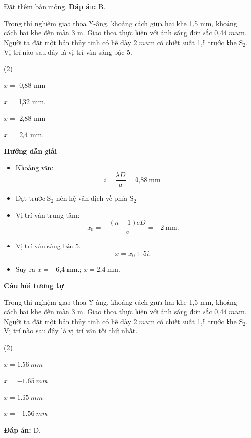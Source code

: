 \begin{dang}{Đặt thêm bản mỏng.}
{\textbf{Đáp án:} B.
}

{Trong thí nghiệm giao thoa Y-âng, khoảng cách giữa hai khe 1,5 mm, khoảng cách hai khe đến màn 3 m. Giao thoa thực hiện với ánh sáng đơn sắc 0,44 $mu$m. Người ta đặt một bản thủy tinh có bề dày 2 $mu$m có chiết suất 1,5 trước khe $\text{S}_2$. Vị trí nào sau đây là vị trí vân sáng bậc 5.
\begin{mcq}(2)
\item $x =$ 0,88 mm.		
\item $x =$ l,32 mm.	  	
\item $x =$ 2,88 mm.		
\item $x =$ 2,4 mm.
\end{mcq}
}
{\begin{center}
	\textbf{Hướng dẫn giải}
\end{center}

\begin{itemize}
	\item Khoảng vân:
	\begin{equation*}
		i=\dfrac{\lambda D}{a} = \text{0,88}\ \text{mm}.
	\end{equation*}
	\item Đặt trước $\text{S}_2$ nên hệ vân dịch về phía $\text{S}_2$.
	\item Vị trí vân trung tâm:
	\begin{equation*}
	x_0= - \dfrac{(n-1)eD}{a}=-2 \ \text{mm}.
	\end{equation*}
	\item Vị trí vân sáng bậc 5:
	\begin{equation*}
	x=x_0 \pm 5i.
	\end{equation*}
	\item Suy ra $x= -\text{6,4}\ \text{mm}.$; $x=\text{2,4}\ \text{mm}$.
\end{itemize}

\begin{center}
	\textbf{Câu hỏi tương tự}
\end{center}

Trong thí nghiệm giao thoa Y-âng, khoảng cách giữa hai khe 1,5 mm, khoảng cách hai khe đến màn 3 m. Giao thoa thực hiện với ánh sáng đơn sắc 0,44 $mu$m. Người ta đặt một bản thủy tinh có bề dày 2 $mu$m có chiết suất 1,5 trước khe $\text{S}_2$. Vị trí nào sau đây là vị trí vân tối thứ nhất.
\begin{mcq}(2)
\item $ x = \SI{+1,56}{mm} $		
\item $ x = \SI{-1,65}{mm} $
\item $ x = \SI{+1,65}{mm} $
\item $ x = \SI{-1,56}{mm} $
\end{mcq}

\textbf{Đáp án:} D.

}

\end{dang}